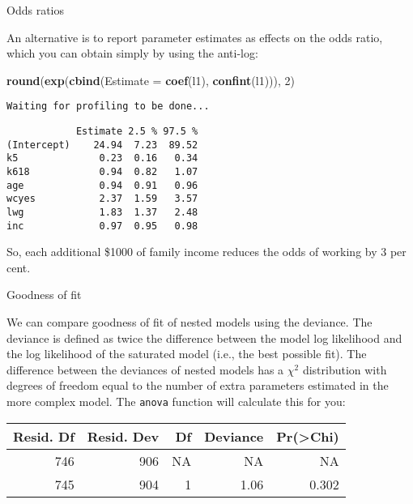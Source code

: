 \documentclass[10pt,ignorenonframetext,]{beamer}
\newenvironment{Shaded}{\begin{snugshade}}{\end{snugshade}}
\newcommand{\KeywordTok}[1]{\textcolor[rgb]{0.13,0.29,0.53}{\textbf{{#1}}}}
\newcommand{\DataTypeTok}[1]{\textcolor[rgb]{0.13,0.29,0.53}{{#1}}}
\newcommand{\DecValTok}[1]{\textcolor[rgb]{0.00,0.00,0.81}{{#1}}}
\newcommand{\NormalTok}[1]{{#1}}
\begin{document}
\begin{frame}[fragile]{Odds ratios}

An alternative is to report parameter estimates as effects on the odds
ratio, which you can obtain simply by using the anti-log:

\begin{Shaded}
\begin{Highlighting}[]
\KeywordTok{round}\NormalTok{(}\KeywordTok{exp}\NormalTok{(}\KeywordTok{cbind}\NormalTok{(}\DataTypeTok{Estimate =} \KeywordTok{coef}\NormalTok{(l1), }\KeywordTok{confint}\NormalTok{(l1))), }\DecValTok{2}\NormalTok{)}
\end{Highlighting}
\end{Shaded}

\begin{verbatim}
Waiting for profiling to be done...
\end{verbatim}

\begin{verbatim}
            Estimate 2.5 % 97.5 %
(Intercept)    24.94  7.23  89.52
k5              0.23  0.16   0.34
k618            0.94  0.82   1.07
age             0.94  0.91   0.96
wcyes           2.37  1.59   3.57
lwg             1.83  1.37   2.48
inc             0.97  0.95   0.98
\end{verbatim}

So, each additional \$1000 of family income reduces the odds of working
by 3 per cent.

\end{frame}

\begin{frame}[fragile]{Goodness of fit}

We can compare goodness of fit of nested models using the deviance. The
deviance is defined as twice the difference between the model log
likelihood and the log likelihood of the saturated model (i.e., the best
possible fit). The difference between the deviances of nested models has
a \(\chi^2\) distribution with degrees of freedom equal to the number of
extra parameters estimated in the more complex model. The \texttt{anova}
function will calculate this for you:

\begin{longtable}[]{@{}rrrrr@{}}
\toprule
Resid. Df & Resid. Dev & Df & Deviance &
Pr(\textgreater{}Chi)\tabularnewline
\midrule
\endhead
746 & 906 & NA & NA & NA\tabularnewline
745 & 904 & 1 & 1.06 & 0.302\tabularnewline
\bottomrule
\end{longtable}

\end{frame}
\end{document}
